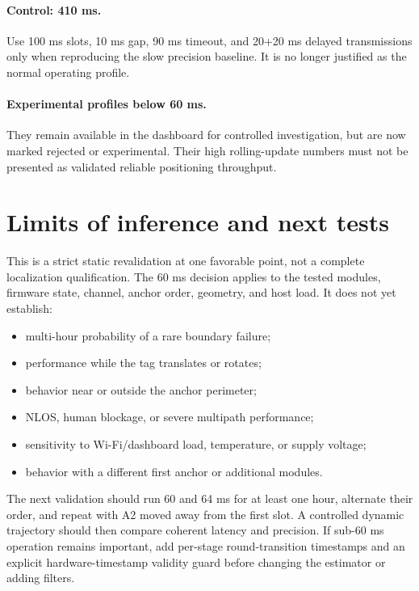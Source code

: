 \documentclass[11pt,a4paper]{article}
\begin{document}
\paragraph{Control: 410 ms.}
Use 100 ms slots, 10 ms gap, 90 ms timeout, and 20+20 ms delayed
transmissions only when reproducing the slow precision baseline. It is no
longer justified as the normal operating profile.

\paragraph{Experimental profiles below 60 ms.}
They remain available in the dashboard for controlled investigation, but are
now marked rejected or experimental. Their high rolling-update numbers must
not be presented as validated reliable positioning throughput.

\section{Limits of inference and next tests}

This is a strict static revalidation at one favorable point, not a complete
localization qualification. The 60 ms decision applies to the tested modules,
firmware state, channel, anchor order, geometry, and host load. It does not yet
establish:

\begin{itemize}[leftmargin=7mm]
  \item multi-hour probability of a rare boundary failure;
  \item performance while the tag translates or rotates;
  \item behavior near or outside the anchor perimeter;
  \item NLOS, human blockage, or severe multipath performance;
  \item sensitivity to Wi-Fi/dashboard load, temperature, or supply voltage;
  \item behavior with a different first anchor or additional modules.
\end{itemize}

The next validation should run 60 and 64 ms for at least one hour, alternate
their order, and repeat with A2 moved away from the first slot. A controlled
dynamic trajectory should then compare coherent latency and precision. If
sub-60 ms operation remains important, add per-stage round-transition
timestamps and an explicit hardware-timestamp validity guard before changing
the estimator or adding filters.
\end{document}
